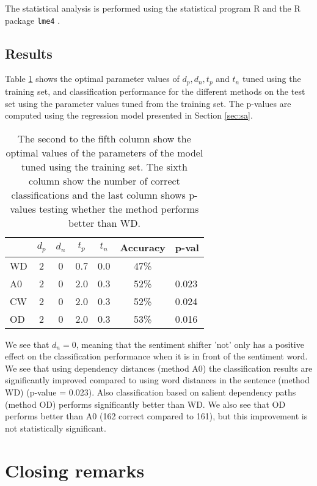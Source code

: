 \documentclass[11pt]{article}
\begin{document}
The statistical analysis is performed using the statistical program R \cite{R} and the R package \verb|lme4| \cite{lme4}.

\subsection{Results}

Table \ref{tab:2} shows the optimal parameter values of $d_p, d_n, t_p$ and $t_n$ tuned using the training set, and classification performance for the different methods on the test set using the parameter values tuned from the training set. The p-values are computed using the regression model presented in Section \ref{sec:sa}.
\begin{table}
  \centering
  \begin{tabular}{|l|cccccl|}
\hline & $d_p$ & $d_n$ & $t_p$ & $t_n$ & \bf Accuracy   & \bf p-val \\ \hline
    WD &    2  &   0  & 0.7  &  0.0  & 47\% & \\
    A0 &    2  &   0  & 2.0  &  0.3  & 52\% & 0.023\\
    CW &    2  &   0  & 2.0  &  0.3  & 52\% & 0.024\\
    OD &    2  &   0  & 2.0  &  0.3  & 53\% & 0.016\\ \hline
  \end{tabular}
  \caption{The second to the fifth column show the optimal values of the parameters of the model tuned using the training set. The sixth column show the number of correct classifications and the last column shows p-values testing whether the method performs better than WD.}
  \label{tab:2}
\end{table}
We see that $d_n = 0$, meaning that the sentiment shifter 'not' only has a positive effect on the classification performance when it is in front of the sentiment word. We see that using dependency distances (method A0) the classification results are significantly improved compared to using word distances in the sentence (method WD) (p-value = 0.023). Also classification based on salient dependency paths (method OD) performs significantly better than WD. We also see that OD performs better than A0 (162 correct compared to 161), but this improvement is not statistically significant. 

\section{Closing remarks}
\label{sec:cr}
\end{document}
